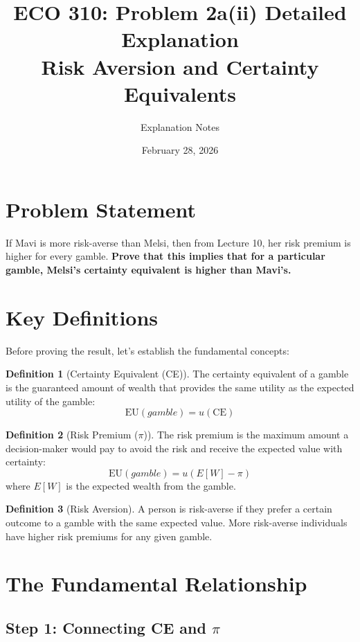 \documentclass[11pt]{article}
\title{ECO 310: Problem 2a(ii) Detailed Explanation\\Risk Aversion and Certainty Equivalents}
\author{Explanation Notes}
\date{February 28, 2026}
\theoremstyle{definition}
\newtheorem{definition}{Definition}
\begin{document}
\maketitle

\section{Problem Statement}

\begin{tcolorbox}[colback=blue!5!white,colframe=blue!75!black,title=Problem 2a(ii)]
If Mavi is more risk-averse than Melsi, then from Lecture 10, her risk premium is higher for every gamble. \textbf{Prove that this implies that for a particular gamble, Melsi's certainty equivalent is higher than Mavi's.}
\end{tcolorbox}

\section{Key Definitions}

Before proving the result, let's establish the fundamental concepts:

\begin{definition}[Certainty Equivalent (CE)]
The certainty equivalent of a gamble is the guaranteed amount of wealth that provides the same utility as the expected utility of the gamble:
\[
\text{EU}(gamble) = u(\text{CE})
\]
\end{definition}

\begin{definition}[Risk Premium ($\pi$)]
The risk premium is the maximum amount a decision-maker would pay to avoid the risk and receive the expected value with certainty:
\[
\text{EU}(gamble) = u(E[W] - \pi)
\]
where $E[W]$ is the expected wealth from the gamble.
\end{definition}

\begin{definition}[Risk Aversion]
A person is risk-averse if they prefer a certain outcome to a gamble with the same expected value. More risk-averse individuals have higher risk premiums for any given gamble.
\end{definition}

\section{The Fundamental Relationship}

\subsection{Step 1: Connecting CE and $\pi$}
\end{document}
